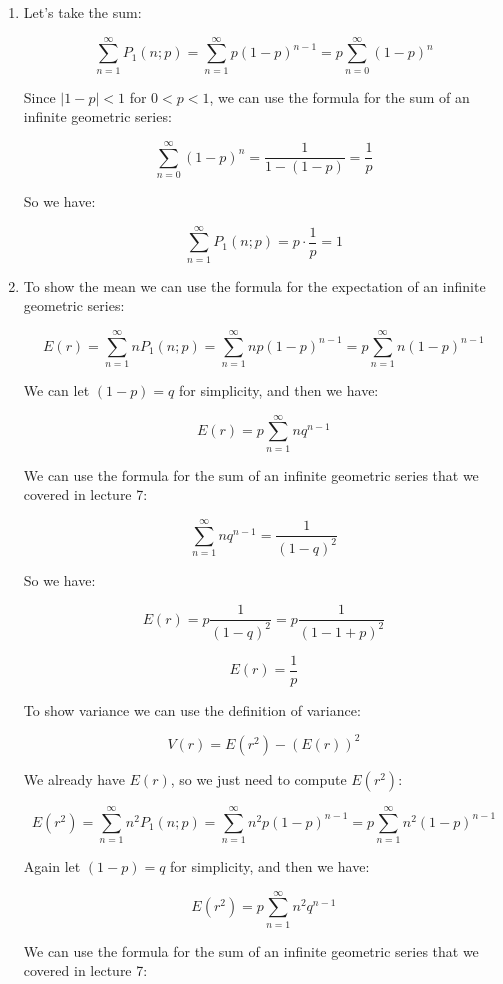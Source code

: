 \documentclass[10pt]{article}
\begin{document}
\begin{enumerate}[label=(\alph*)]
	\item Let's take the sum:

	      \[ \sum _{n=1}^{\infty} P_1(n;p) = \sum_{n=1}^{\infty} p(1-p)^{n-1} = p \sum_{n=0}^{\infty} (1-p)^n \]

	      Since $|1-p| < 1$ for $0 < p < 1$, we can use the formula for the sum of an infinite geometric series:

	      \[ \sum_{n=0}^{\infty} (1-p)^n = \frac{1}{1-(1-p)} = \frac{1}{p} \]

	      So we have:

	      \[ \sum _{n=1}^{\infty} P_1(n;p) = p \cdot \frac{1}{p} = 1 \]


	\item To show the mean  we can use the formula for the expectation of an infinite geometric series:

	      \[ E(r) = \sum_{n=1}^{\infty} n P_1(n;p) = \sum_{n=1}^{\infty} n p (1-p)^{n-1} = p \sum_{n=1}^{\infty} n (1-p)^{n-1} \]

	      We can let $(1-p) = q$ for simplicity, and then we have:

	      \[ E(r) = p \sum_{n=1}^{\infty} n q^{n-1} \]

	      We can use the formula for the sum of an infinite geometric series that we covered in lecture 7:

	      \[ \sum_{n=1}^{\infty} n q^{n-1} = \frac{1}{(1-q)^2} \]


	      So we have:

	      \[ E(r) = p \frac{1}{(1-q)^2} = p \frac{1}{(1-1+p)^2} \]

	      \[ \boxed{E(r) = \frac{1}{p}} \]

	      To show variance we can use the definition of variance:

	      \[ V(r) = E(r^2) - (E(r))^2 \]

	      We already have $E(r)$, so we just need to compute $E(r^2)$:

	      \[ E(r^2) = \sum_{n=1}^{\infty} n^2 P_1(n;p) = \sum_{n=1}^{\infty} n^2 p (1-p)^{n-1} = p \sum_{n=1}^{\infty} n^2 (1-p)^{n-1} \]

	      Again let $(1-p) = q$ for simplicity, and then we have:

	      \[ E(r^2) = p \sum_{n=1}^{\infty} n^2 q^{n-1} \]

	      We can use the formula for the sum of an infinite geometric series that we covered in lecture 7:


\end{enumerate}
\end{document}
